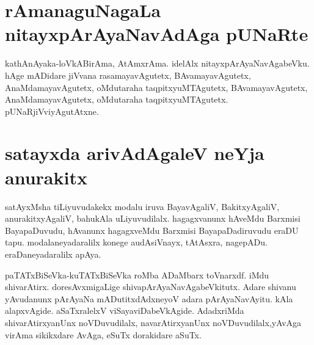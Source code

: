 \section*{rAmanaguNagaLa nitayxpArAyaNavAdAga pUNaRte}

kathAnAyaka-loVkABirAma, AtAmxrAma. idelAlx nitayxpArAyaNavAgabeVku. hAge mADidare jiVvana rasamayavAgutetx, BAvamayavAgutetx, AnaMdamayavAgutetx, oMdutaraha taqpitxyuMTAgutetx, BAvamayavAgutetx, AnaMdamayavAgutetx, oMdutaraha taqpitxyuMTAgutetx. pUNaRjiVviyAgutAtxne. 

\section*{satayxda arivAdAgaleV neYja anurakitx}

satAyxMsha tiLiyuvudakekx modalu iruva BayavAgaliV, BakitxyAgaliV, anurakitxyAgaliV, bahukAla uLiyuvudilalx. hagagxvanunx hAveMdu Barxmisi BayapaDuvudu, hAvanunx hagagxveMdu Barxmisi BayapaDadiruvudu eraDU tapu. modalaneyadaralilx konege audAsiVnayx, tAtAsxra, nagepADu. eraDaneyadaralilx apAya.

paTATxBiSeVka-kuTATxBiSeVka  roMba ADaMbarx toVnarxdf. iMdu  shivarAtirx. doresAvxmigaLige shivapArAyaNavAgabeVkitutx. Adare shivanu yAvudanunx pArAyaNa mADutitxdAdxneyoV adara pArAyaNavAyitu. kAla alapxvAgide. aSaTxralelxV viSayaviDabeVkAgide. AdadxriMda shivarAtirxyanUnx  noVDuvudilalx, navarAtirxyanUnx noVDuvudilalx,yAvAga virAma sikikxdare AvAga, eSuTx dorakidare aSuTx. 



